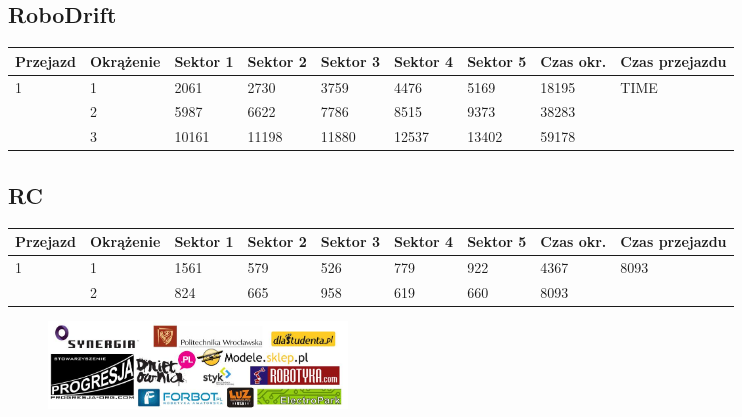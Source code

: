 \documentclass[11pt]{article}
\begin{document}
\subsection{RoboDrift}
\begin{table}[h]
\begin{tabular}{|l|l|l|l|l|l|l|l|l|}
\hline
   Przejazd        & Okrążenie & Sektor 1 & Sektor 2 & Sektor 3 & Sektor 4 & Sektor 5 & Czas okr. & Czas przejazdu    \\ \hline
\multirow{3}{*}{1}& 1 &2061& 2730& 3759& 4476& 5169& 18195& \multirow{3}{*}{TIME} \\ \cline{2-8}
& 2& 5987& 6622& 7786& 8515& 9373& 38283& \\ \cline{2-8}
& 3& 10161& 11198& 11880& 12537& 13402& 59178& \\ \hline
\end{tabular}
\end{table}
\subsection{RC}
\begin{table}[h]
\begin{tabular}{|l|l|l|l|l|l|l|l|l|}
\hline
 Przejazd        & Okrążenie & Sektor 1 & Sektor 2 & Sektor 3 & Sektor 4 & Sektor 5 & Czas okr. & Czas przejazdu    \\ \hline
\multirow{2}{*}{1}& 1 &1561& 579& 526& 779& 922& 4367& \multirow{2}{*}{8093} \\ \cline{2-8}
& 2& 824& 665& 958& 619& 660& 8093& \\ \hline
\end{tabular}
\end{table}
\clearpage
\newpage
\begin{figure}
\centering
\includegraphics[width=300px, keepaspectratio=true]
{images/sponsors.jpg}
\end{figure}
\end{document}
